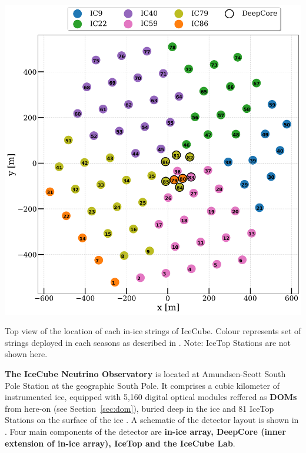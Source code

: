 \begin{marginfigure}
	\includegraphics{./figures/nu_in_icecube/IC_Phase_Array.png}
	\caption[Top view of IceCube geometry]{Top view of the location of each in-ice strings of IceCube. Colour represents set of strings deployed in each seasons as described in . Note: IceTop Stations are not shown here.}
\end{marginfigure}

\textbf{The IceCube Neutrino Observatory} is located at Amundsen-Scott South Pole Station at the geographic South Pole. It comprises a cubic kilometer of instrumented ice, equipped with 5,160 digital optical modules reffered as \textbf{DOMs} from here-on (see Section~\ref{sec:dom}), buried deep in the ice and 81 IceTop Stations on the surface of the ice . A schematic of the detector layout is shown in . Four main components of the detector are \textbf{in-ice array, DeepCore (inner extension of in-ice array), IceTop and the IceCube Lab}. \par


